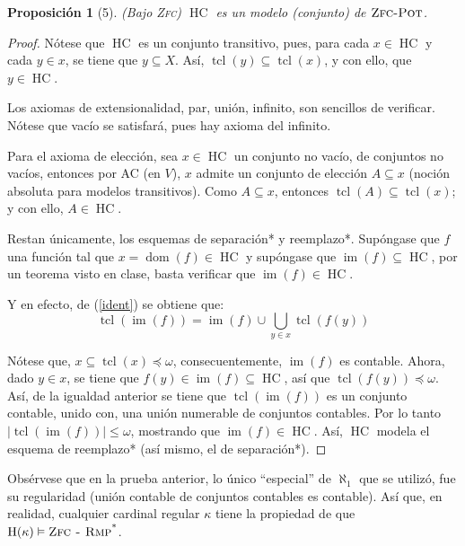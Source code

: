 \documentclass[letterpaper,DIV=15,12pt]{scrartcl}
\theoremstyle{manual}
\newtheorem{proposicion}{Proposición}
\begin{document}
    \begin{proposicion}[5]
        (Bajo \textsc{Zfc}) $\operatorname*{HC}$ es un modelo (conjunto) de $\operatorname*{\textsc{Zfc-Pot}}$.
    \end{proposicion}
    \begin{proof}
        Nótese que $\operatorname*{HC}$ es un conjunto transitivo, pues, para cada $x \in \operatorname*{HC}$ y cada $y \in x$, se tiene que $y \subseteq X$. Así, $\operatorname*{tcl}(y) \subseteq \operatorname*{tcl}(x)$, y con ello, que $y \in \operatorname*{HC}$.

        Los axiomas de extensionalidad, par, unión, infinito, son sencillos de verificar. Nótese que vacío se satisfará, pues hay axioma del infinito.
        
        Para el axioma de elección, sea $x \in \operatorname*{HC}$ un conjunto no vacío, de conjuntos no vacíos, entonces por \textsc{AC} (en $V$), $x$ admite un conjunto de elección $A \subseteq x$ (noción absoluta para modelos transitivos). Como $A \subseteq x$, entonces $\operatorname*{tcl}(A) \subseteq \operatorname*{tcl}(x)$; y con ello, $A \in \operatorname*{HC}$.

        Restan únicamente, los esquemas de separación* y reemplazo*. Supóngase que $f$ una función tal que $x=\operatorname*{dom}(f) \in \operatorname*{HC}$ y supóngase que $\operatorname*{im}(f) \subseteq \operatorname*{HC}$, por un teorema visto en clase, basta verificar que $\operatorname*{im}(f) \in \operatorname*{HC}$.

        Y en efecto, de (\ref{ident}) se obtiene que:
        \[ \operatorname*{tcl}(\operatorname*{im}(f)) = \operatorname*{im}(f) \cup \bigcup_{y \in x} \operatorname*{tcl}(f(y)) \]

        Nótese que, $x \subseteq \operatorname*{tcl}(x) \preccurlyeq \omega$, consecuentemente, $\operatorname*{im}(f)$ es contable. Ahora, dado $y \in x$, se tiene que $f(y) \in \operatorname*{im}(f) \subseteq \operatorname*{HC}$, así que $\operatorname*{tcl}(f(y)) \preccurlyeq \omega$. Así, de la igualdad anterior se tiene que $\operatorname*{tcl}(\operatorname*{im}(f))$ es un conjunto contable, unido con, una unión numerable de conjuntos contables. Por lo tanto $|\operatorname*{tcl}(\operatorname*{im}(f))| \leq \omega$, mostrando que $\operatorname*{im}(f) \in \operatorname*{HC}$. Así, $\operatorname*{HC}$ modela el esquema de reemplazo* (así mismo, el de separación*).
    \end{proof}

    Obsérvese que en la prueba anterior, lo único ``especial'' de $\aleph_1$ que se utilizó, fue su regularidad (unión contable de conjuntos contables es contable). Así que, en realidad, cualquier cardinal regular $\kappa$ tiene la propiedad de que $\operatorname*{H}(\kappa) \vDash \operatorname*{\textsc{Zfc - Rmp}^*}$.
\end{document}
